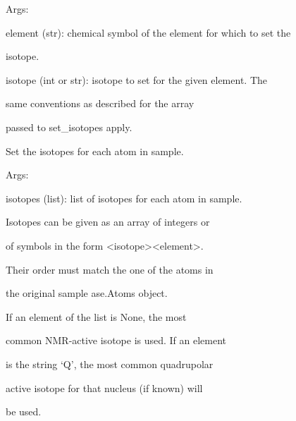 \documentclass[letterpaper,10pt,english]{sphinxmanual}
\begin{document}
\begin{fulllineitems}
\begin{fulllineitems}
\begin{DUlineblock}{0em}
\item[] Args:
\item[]
\begin{DUlineblock}{\DUlineblockindent}
\item[] element (str): chemical symbol of the element for which to set the
\item[]
\begin{DUlineblock}{\DUlineblockindent}
\item[] isotope.
\end{DUlineblock}
\item[] isotope (int or str): isotope to set for the given element. The
\item[]
\begin{DUlineblock}{\DUlineblockindent}
\item[] same conventions as described for the array
\item[] passed to set\_isotopes apply.
\end{DUlineblock}
\end{DUlineblock}
\end{DUlineblock}

\end{fulllineitems}


\begin{fulllineitems}
\label{doctree/soprano.calculate.nmr.nmr:soprano.calculate.nmr.nmr.NMRCalculator.set_isotopes}
Set the isotopes for each atom in sample.

\begin{DUlineblock}{0em}
\item[] Args:
\item[]
\begin{DUlineblock}{\DUlineblockindent}
\item[] isotopes (list): list of isotopes for each atom in sample.
\item[]
\begin{DUlineblock}{\DUlineblockindent}
\item[] Isotopes can be given as an array of integers or
\item[] of symbols in the form \textless{}isotope\textgreater{}\textless{}element\textgreater{}.
\item[] Their order must match the one of the atoms in
\item[] the original sample ase.Atoms object.
\item[] If an element of the list is None, the most
\item[] common NMR-active isotope is used. If an element
\item[] is the string `Q', the most common quadrupolar
\item[] active isotope for that nucleus (if known) will
\item[] be used.
\end{DUlineblock}
\end{DUlineblock}
\end{DUlineblock}


\end{fulllineitems}
\end{fulllineitems}
\end{document}
